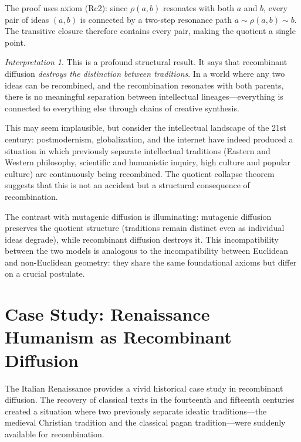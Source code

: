 \documentclass[11pt,openany]{book}
\theoremstyle{definition}
\theoremstyle{plain}
\theoremstyle{remark}
\newtheorem{interpretation}[axiom]{Interpretation}
\newcommand{\res}{\sim}                      %
\begin{document}
The proof uses axiom (Rc2): since $\rho(a, b)$ resonates with both $a$ and $b$, every pair of ideas $(a, b)$ is connected by a two-step resonance path $a \res \rho(a, b) \res b$. The transitive closure therefore contains every pair, making the quotient a single point.

\begin{interpretation}
This is a profound structural result. It says that recombinant diffusion \emph{destroys the distinction between traditions}. In a world where any two ideas can be recombined, and the recombination resonates with both parents, there is no meaningful separation between intellectual lineages---everything is connected to everything else through chains of creative synthesis.

This may seem implausible, but consider the intellectual landscape of the 21st century: postmodernism, globalization, and the internet have indeed produced a situation in which previously separate intellectual traditions (Eastern and Western philosophy, scientific and humanistic inquiry, high culture and popular culture) are continuously being recombined. The quotient collapse theorem suggests that this is not an accident but a structural consequence of recombination.

The contrast with mutagenic diffusion is illuminating: mutagenic diffusion preserves the quotient structure (traditions remain distinct even as individual ideas degrade), while recombinant diffusion destroys it. This incompatibility between the two models is analogous to the incompatibility between Euclidean and non-Euclidean geometry: they share the same foundational axioms but differ on a crucial postulate.
\end{interpretation}

\section{Case Study: Renaissance Humanism as Recombinant Diffusion}

The Italian Renaissance provides a vivid historical case study in recombinant diffusion. The recovery of classical texts in the fourteenth and fifteenth centuries created a situation where two previously separate ideatic traditions---the medieval Christian tradition and the classical pagan tradition---were suddenly available for recombination.
\end{document}
